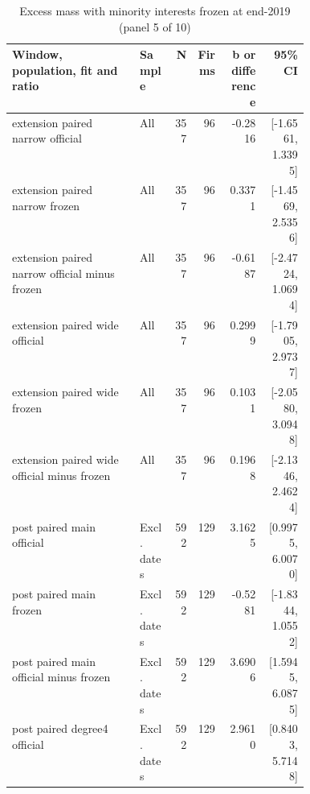\begin{table}[!htbp]\centering\scriptsize
\caption{Excess mass with minority interests frozen at end-2019 (panel 5 of 10)}
\begin{threeparttable}
\begin{tabular}{p{0.43\linewidth}lrrrr}
\toprule
Window, population, fit and ratio & Sample & N & Firms & b or difference & 95\% CI \\
\midrule
extension paired narrow official & All & 357 & 96 & -0.2816 & [-1.6561, 1.3395] \\
extension paired narrow frozen & All & 357 & 96 & 0.3371 & [-1.4569, 2.5356] \\
extension paired narrow official minus frozen & All & 357 & 96 & -0.6187 & [-2.4724, 1.0694] \\
extension paired wide official & All & 357 & 96 & 0.2999 & [-1.7905, 2.9737] \\
extension paired wide frozen & All & 357 & 96 & 0.1031 & [-2.0580, 3.0948] \\
extension paired wide official minus frozen & All & 357 & 96 & 0.1968 & [-2.1346, 2.4624] \\
post paired main official & Excl. dates & 592 & 129 & 3.1625 & [0.9975, 6.0070] \\
post paired main frozen & Excl. dates & 592 & 129 & -0.5281 & [-1.8344, 1.0552] \\
post paired main official minus frozen & Excl. dates & 592 & 129 & 3.6906 & [1.5945, 6.0875] \\
post paired degree4 official & Excl. dates & 592 & 129 & 2.9610 & [0.8403, 5.7148] \\
\bottomrule
\end{tabular}
\begin{tablenotes}[flushleft]\footnotesize

\end{tablenotes}
\end{threeparttable}
\end{table}
